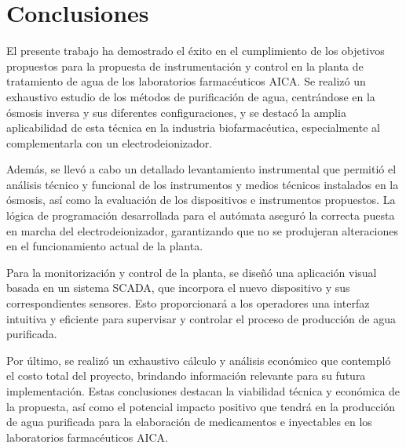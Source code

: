 \chapter*{Conclusiones}
{}
El presente trabajo ha demostrado el éxito en el cumplimiento de los objetivos propuestos para la propuesta de instrumentación y control en la planta de tratamiento de agua de los laboratorios farmacéuticos AICA. Se realizó un exhaustivo estudio de los métodos de purificación de agua, centrándose en la ósmosis inversa y sus diferentes configuraciones, y se destacó la amplia aplicabilidad de esta técnica en la industria biofarmacéutica, especialmente al complementarla con un electrodeionizador.

Además, se llevó a cabo un detallado levantamiento instrumental que permitió el análisis técnico y funcional de los instrumentos y medios técnicos instalados en la ósmosis, así como la evaluación de los dispositivos e instrumentos propuestos. La lógica de programación desarrollada para el autómata aseguró la correcta puesta en marcha del electrodeionizador, garantizando que no se produjeran alteraciones en el funcionamiento actual de la planta.

Para la monitorización y control de la planta, se diseñó una aplicación visual basada en un sistema SCADA, que incorpora el nuevo dispositivo y sus correspondientes sensores. Esto proporcionará a los operadores una interfaz intuitiva y eficiente para supervisar y controlar el proceso de producción de agua purificada.

Por último, se realizó un exhaustivo cálculo y análisis económico que contempló el costo total del proyecto, brindando información relevante para su futura implementación. Estas conclusiones destacan la viabilidad técnica y económica de la propuesta, así como el potencial impacto positivo que tendrá en la producción de agua purificada para la elaboración de medicamentos e inyectables en los laboratorios farmacéuticos AICA.




